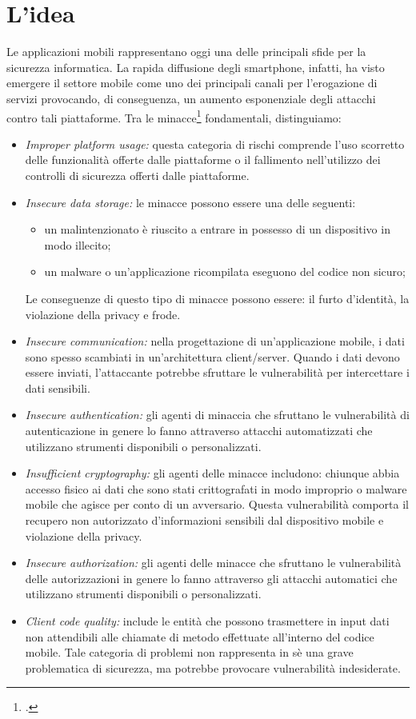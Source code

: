 \section{L'idea}\label{sec:l'idea}
Le applicazioni mobili rappresentano oggi una delle principali sfide per la sicurezza informatica.
La rapida diffusione degli smartphone, infatti, ha visto emergere il settore mobile come uno dei principali canali per l'erogazione di servizi provocando, di conseguenza, un aumento esponenziale degli attacchi contro tali piattaforme.
Tra le minacce\footcite{site:owasp} fondamentali, distinguiamo:

\begin{itemize}
    \item \textit{Improper platform usage:} questa categoria di rischi comprende l'uso scorretto delle funzionalità offerte dalle piattaforme o il fallimento nell'utilizzo dei controlli di sicurezza offerti dalle piattaforme.
    \item \textit{Insecure data storage:} le minacce possono essere una delle seguenti:
    \begin{itemize}
        \item un malintenzionato è riuscito a entrare in possesso di un dispositivo in modo illecito;
        \item un malware o un'applicazione ricompilata eseguono del codice non sicuro;
    \end{itemize}
    Le conseguenze di questo tipo di minacce possono essere: il furto d'identità, la violazione della privacy e frode.
    \item \textit{Insecure communication:}
    nella progettazione di un'applicazione mobile, i dati sono spesso scambiati in un'architettura client/server.
    Quando i dati devono essere inviati, l'attaccante potrebbe sfruttare le vulnerabilità per intercettare i dati sensibili.
    \item \textit{Insecure authentication:}
    gli agenti di minaccia che sfruttano le vulnerabilità di autenticazione in genere lo fanno attraverso attacchi automatizzati che utilizzano strumenti disponibili o personalizzati.
    \item \textit{Insufficient cryptography:} gli agenti delle minacce includono: chiunque abbia accesso fisico ai dati che sono stati crittografati in modo improprio o malware mobile che agisce per conto di un avversario.
    Questa vulnerabilità comporta il recupero non autorizzato d'informazioni sensibili dal dispositivo mobile e violazione della privacy.
    \item \textit{Insecure authorization:}
    gli agenti delle minacce che sfruttano le vulnerabilità delle autorizzazioni in genere lo fanno attraverso gli attacchi automatici che utilizzano strumenti disponibili o personalizzati.
    \item \textit{Client code quality:} include le entità che possono trasmettere in input dati non attendibili alle chiamate di metodo effettuate all'interno del codice mobile.
    Tale categoria di problemi non rappresenta in sè una grave problematica di sicurezza, ma potrebbe provocare vulnerabilità indesiderate.


\end{itemize}
